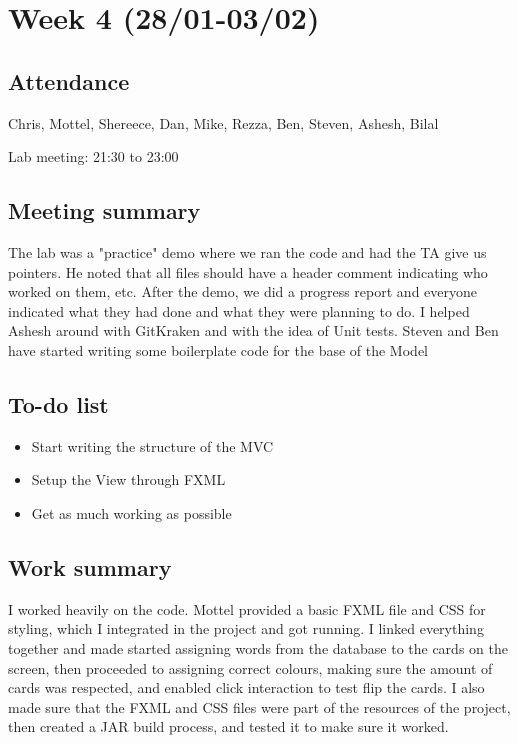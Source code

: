 \documentclass[letterpaper,10pt]{article}
\begin{document}
\pagebreak


\section{Week 4 (28/01-03/02)}

\subsection{Attendance}
Chris, Mottel, Shereece, Dan, Mike, Rezza, Ben, Steven, Ashesh, Bilal

\noindent Lab meeting: 21:30 to 23:00

\subsection{Meeting summary}
The lab was a "practice" demo where we ran the code and had the TA give us pointers. He noted that all files should have a header comment indicating who worked on them, etc. After the demo, we did a progress report and everyone indicated what they had done and what they were planning to do. I helped Ashesh around with GitKraken and with the idea of Unit tests. Steven and Ben have started writing some boilerplate code for the base of the Model

\subsection{To-do list}
\begin{itemize}
\item Start writing the structure of the MVC
\item Setup the View through FXML
\item Get as much working as possible
\end{itemize}

\subsection{Work summary}
I worked heavily on the code. Mottel provided a basic FXML file and CSS for styling, which I integrated in the project and got running. I linked everything together and made started assigning words from the database to the cards on the screen, then proceeded to assigning correct colours, making sure the amount of cards was respected, and enabled click interaction to test flip the cards. I also made sure that the FXML and CSS files were part of the resources of the project, then created a JAR build process, and tested it to make sure it worked.
\end{document}
